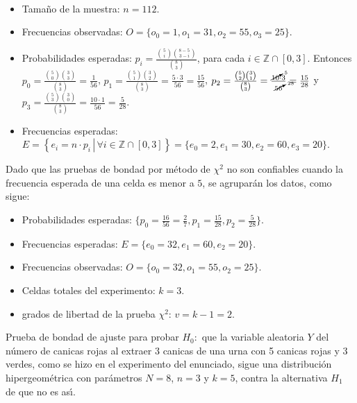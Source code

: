 \begin{solucion}
 \begin{datos}
  $\phantom{0}$
  \begin{itemize}
   \item Tama\~no de la muestra: $n=112$.
   \item Frecuencias observadas: $O = \{o_0=1, o_1=31, o_2=55, o_3=25\}$.
   \item Probabilidades esperadas: $p_i =
   \frac{\binom{5}{i}\binom{8-5}{3-i}}{
   \binom{8}{3}}$,
   para cada $i \in \mathbb{Z}\cap[0,3]$.
   Entonces $p_0 = \frac{\binom{5}{0}\binom{3}{3}}{\binom{8}{3}}
   = \frac{1}{56}$,
   $p_1 = \frac{\binom{5}{1}\binom{3}{2}}{\binom{8}{3}}
   = \frac{5\cdot 3}{56} = \frac{15}{56}$,
   $p_2 = \frac{\binom{5}{2}\binom{3}{1}}{\binom{8}{3}}
   = \frac{\cancelto{5}{10}\cdot 3}{\cancelto{28}{56}} = \frac{15}{28}$
   y $p_3 = \frac{\binom{5}{3}\binom{3}{0}}{\binom{8}{3}}
   = \frac{10\cdot 1}{56} = \frac{5}{28}$.
   \item Frecuencias esperadas: $E = \left\{
   \left.e_i=n\cdot p_i\,\right|\,\forall i\in\mathbb{Z}\cap[0,3] \right\}
   = \{e_0 = 2, e_1 = 30, e_2 = 60, e_3 = 20 \}$.
  \end{itemize}
  Dado que las pruebas de bondad por m\'etodo de $\chi^2$ no son confiables
  cuando la frecuencia esperada de una celda es menor a $5$,
  se agrupar\'an los datos, como sigue:
  \begin{itemize}
   \item Probabilidades esperadas:
   $\{ p_0 = \frac{16}{56} = \frac{2}{7}, p_1 = \frac{15}{28},
   p_2 = \frac{5}{28} \}$.
   \item Frecuencias esperadas: $E=\{e_0 = 32, e_1 = 60, e_2 = 20\}$.
   \item Frecuencias observadas: $O=\{o_0 = 32, o_1 = 55, o_2 = 25\}$.
   \item Celdas totales del experimento: $k=3$.
   \item grados de libertad de la prueba $\chi^2$: $v= k-1 = 2$.
  \end{itemize}
 \end{datos}

 \begin{hipotesis}
  Prueba de bondad de ajuste para probar $H_0:$
  que la variable aleatoria $Y$ del n\'umero de canicas rojas
  al extraer $3$ canicas de una urna con 5 canicas rojas y 3 verdes,
  como se hizo en el experimento del enunciado,
  sigue una distribuci\'on hipergeom\'etrica
  con par\'ametros $N=8$, $n=3$ y $k=5$,
  contra la alternativa $H_1$ de que no es as\'{\i}.
 \end{hipotesis}


\end{solucion}
